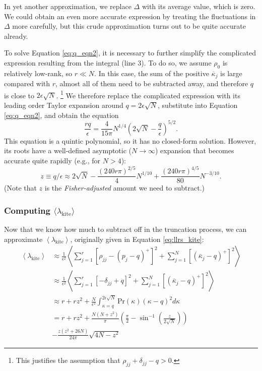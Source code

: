 \documentclass[aps,pra, twocolumn]{revtex4-1}
\newcommand{\expect}[1]{\ensuremath{\left\langle#1\right\rangle}}
\begin{document}
In yet another approximation, we replace $\Delta$ with its average value, which is zero.  We could obtain an even more accurate expression 
 by treating the fluctuations in $\Delta$ more carefully, but this crude approximation turns out to be quite accurate already.

To solve Equation \eqref{eq:q_eqn2}, it is necessary to further simplify the complicated expression resulting from the integral (line 3).  To do so, we 
assume  $\rho_0$ is relatively low-rank, so $r \ll N$.  In this case, the sum of the positive $\overline{\kappa}_j$ is large compared 
with $r$, almost all of them need to be subtracted away, and therefore $q$ is close to $2\epsilon\sqrt{N}$.  \footnote{This justifies the assumption that $\rho_{jj} + \delta_{jj} - q > 0$.} We therefore replace 
the complicated expression with its leading order Taylor expansion around $q=2\epsilon\sqrt{N}$, substitute into Equation \eqref{eq:q_eqn2}, and 
obtain the equation
\begin{equation}
\frac{rq}{\epsilon}  = \frac{4}{15\pi}N^{1/4}\left(2\sqrt{N}-\frac{q}{\epsilon}\right)^{5/2}.
\end{equation}
This equation is a quintic polynomial, so it has no closed-form solution.  However, its roots have a well-defined asymptotic ($N\to
\infty$) expansion that becomes accurate quite rapidly (e.g., for $N>4$):
\begin{equation}
\label{eq:truncation}
z \equiv q/\epsilon \approx 2\sqrt{N}-\frac{(240r\pi)^{2/5}}{4}N^{1/10}+\frac{(240r\pi)^{4/5}}{80}N^{-3/10}.
\end{equation}
(Note that $z$ is the \emph{Fisher-adjusted} amount we need to subtract.)

\subsubsection{Computing $\langle \lambda_{\mathrm{kite}}\rangle$}
Now that we know how much to subtract off in the truncation process, we can approximate $\expect{\lambda_{\mathrm{kite}}}$, originally given in Equation \eqref{eq:llrs_kite}:
\begin{align}
\nonumber \expect{\lambda_{\mathrm{kite}}} &\approx  \frac{1}{\epsilon^{2}}\left\langle\sum_{j=1}^{r}[\rho_{jj}- (p_j-q)^{+}]^2 + \sum_{j=1}^{N}\left[(\bar{\kappa}_j-q)^+\right]^2 \right\rangle\\
\nonumber &\approx \frac{1}{\epsilon^{2}} \left\langle\sum_{j=1}^{r}[-\delta_{jj} +  q ]^2 + \sum_{j=1}^{N}\left[(\bar{\kappa}_j-q)^+\right]^2 \right\rangle\\
\nonumber  &\approx r + rz^2 + \frac{N}{\epsilon^{2}}\int_{\kappa=q}^{2\epsilon\sqrt{N}}{ \mathrm{Pr}(\kappa)(\kappa-q)^2 d\kappa} \\
\nonumber &=r + rz^{2} + \frac{N(N+z^{2})}{\pi}\left(\frac{\pi}{2} - \sin^{-1}\left(\frac{z}{2\sqrt{N}}\right)\right) \\
& - \frac{z(z^{2}+26N)}{24\pi}\sqrt{4N-z^{2}}
\end{align}
\end{document}
